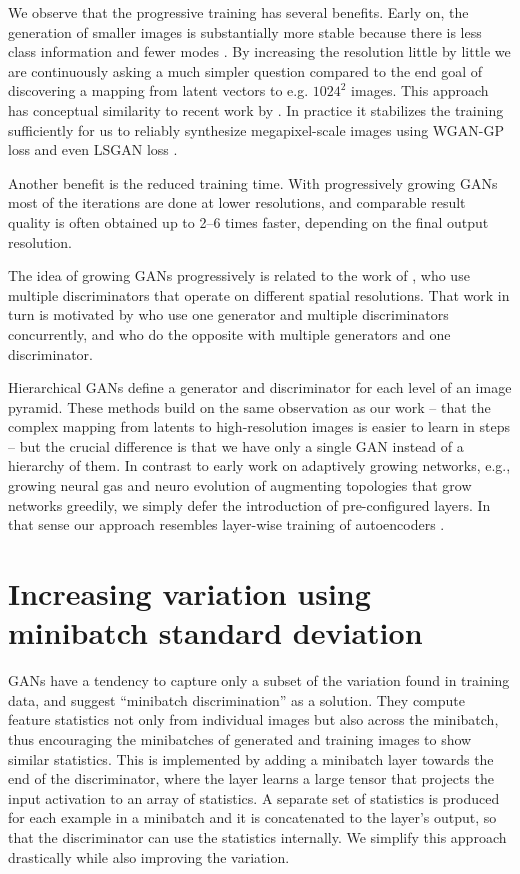 \documentclass{article}
\newcommand{\FINAL}[2][]{#2} %
\begin{document}
We observe that the progressive training has several benefits. %
Early on, the generation of smaller images is substantially more stable because there is less class information and fewer modes \citep{Odena2017}. By increasing the resolution little by little we are continuously asking a much simpler question compared to the end goal of discovering a mapping from latent vectors to e.g. $1024^2$ images. This approach has conceptual similarity to recent work by \cite{Chen2017}. In practice it stabilizes the training sufficiently for us to reliably synthesize megapixel-scale images using WGAN-GP loss \citep{Gulrajani2017} and even LSGAN loss \citep{Mao2016}.

Another benefit is the reduced training time. With progressively growing GANs most of the iterations are done at lower resolutions, and comparable result quality is often obtained up to 2--6 times faster, depending on the final output resolution.

\figincremental

The idea of growing GANs progressively is related to the work of \cite{Wang2017}, who use multiple discriminators that operate on different spatial resolutions. 
That work in turn is motivated by \cite{Durugkar2016} who use one generator and multiple discriminators concurrently, and \cite{Ghosh2017} who do the opposite with multiple generators and one discriminator.
\FINAL{
Hierarchical GANs \citep{Denton2015,Huang2016,Zhang2016} define a generator and discriminator for each level of an image pyramid. These methods build on the same observation as our work -- that the complex mapping from latents to high-resolution images is easier to learn in steps -- but the crucial difference is that we have only a single GAN instead of a hierarchy of them.}
In contrast to early work on adaptively growing networks, e.g., growing neural gas \citep{Fritzke1994} and neuro evolution of augmenting topologies \citep{Stanley2002} that grow networks greedily, we simply defer the introduction of pre-configured layers. In that sense our approach resembles layer-wise training of autoencoders \citep{Bengio2006}.

\figfadein

\section{Increasing variation using minibatch standard deviation}
\label{sec:variation}

GANs have a tendency to capture only a subset of the variation found in training data, and \cite{Salimans2016B} suggest ``minibatch discrimination'' as a solution. They compute feature statistics not only from individual images but also across the minibatch, thus encouraging the minibatches of generated and training images to show similar statistics.
This is implemented by adding a minibatch layer towards the end of the discriminator, where the layer learns a large tensor that projects the input activation to an array of statistics. A separate set of statistics is produced for each example in a minibatch and it is concatenated to the layer's output, so that the discriminator can use the statistics internally. We simplify this approach drastically while also improving the variation.
\end{document}
